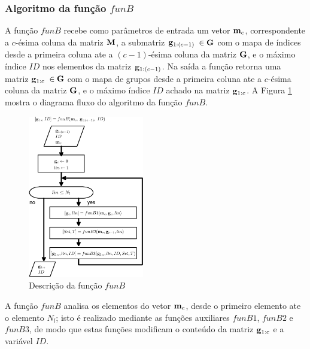 \subsubsection{Algoritmo da função $funB$}
\label{subsubsec:funB}
A função $funB$ recebe como parâmetros de entrada um vetor $\VECTOR{m}_{c}$, correspondente a 
$c$-ésima coluna da matriz $\MATRIX{M}$, a submatriz $\VECTOR{g}_{1:(c-1)}$ $\in\MATRIX{G}$ com o mapa de índices
desde a primeira coluna ate a $(c-1)$-ésima coluna da matriz $\MATRIX{G}$, 
e o máximo índice $ID$ nos elementos da matriz $\VECTOR{g}_{1:(c-1)}$. 
Na saída a função retorna uma matriz $\VECTOR{g}_{1:c}$ $\in\MATRIX{G}$ com o mapa de grupos
desde a primeira coluna ate a $c$-ésima coluna da matriz $\MATRIX{G}$, 
e o máximo índice $ID$ achado na matriz $\VECTOR{g}_{1:c}$.
A Figura \ref{fig:funB} mostra o diagrama fluxo do algoritmo da função $funB$.
\begin{figure}[!htb]
\centering
\includegraphics[width=0.45\textwidth]{section-cumulos/funB.eps}
\caption{Descrição da função $funB$ }
\label{fig:funB}
\end{figure}
A função $funB$ analisa os elementos do vetor $\VECTOR{m}_{c}$, desde o primeiro
elemento ate o elemento $N_l$; isto é realizado mediante as funções auxiliares $funB1$, $funB2$ e $funB3$,
de modo que estas funções modificam o conteúdo da matriz $\VECTOR{g}_{1:c}$ e a variável $ID$.

